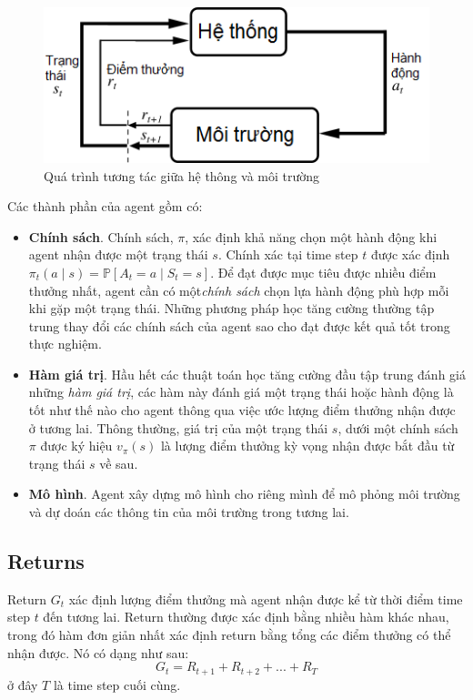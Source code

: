 	\begin{figure}
		\centering
		\includegraphics[width=\textwidth]{AgentEnvironment}
		\caption{Quá trình tương tác giữa hệ thông và môi trường}
		\label{AgentEnvironment}
	\end{figure}
	
	Các thành phần của agent gồm có:
	\begin{itemize}
		\item \textbf{Chính sách}. Chính sách, $\pi$, xác định khả năng chọn một hành động khi agent nhận được một trạng thái $s$. Chính xác tại time step $t$ được xác định $\pi_t(a \mid s) = \mathbb{P}[\mathit{A_t} = a \mid \mathit{S_t} = s]$. Để đạt được mục tiêu được nhiều điểm thưởng nhất, agent cần có một\textit{chính sách} chọn lựa hành động phù hợp mỗi khi gặp một trạng thái. Những phương pháp học tăng cường thường tập trung thay đổi các chính sách của agent sao cho đạt được kết quả tốt trong thực nghiệm.
		\item \textbf{Hàm giá trị}. Hầu hết các thuật toán học tăng cường đầu tập trung đánh giá những \textit{hàm giá trị}, các hàm này đánh giá một trạng thái hoặc hành động là tốt như thế nào cho agent thông qua việc ước lượng điểm thưởng nhận được ở tương lai. Thông thường, giá trị của một trạng thái $s$, dưới một chính sách $\pi$  được ký hiệu $v_{\pi}(s)$ là lượng điểm thưởng kỳ vọng nhận được bắt đầu từ trạng thái $s$ về sau.
		\item \textbf{Mô hình}. Agent xây dựng mô hình cho riêng mình để mô phỏng môi trường và dự doán các thông tin của môi trường trong tương lai.
	\end{itemize}	
	
	\subsection{Returns}
	Return $\mathit{G_t}$ xác định lượng điểm thưởng mà agent nhận được kể từ thời điểm time step $t$ đến tương lai. Return thường được xác định bằng nhiều hàm khác nhau, trong đó hàm đơn giản nhất xác định return bằng tổng các điểm thưởng có thể nhận được. Nó có dạng như sau:
	\begin{equation}
	\mathit{G_t} = \mathit{R_{t+1}} + \mathit{R_{t+2}} + ... + \mathit{R_{T}}
	\end{equation}	
	ở đây $T$ là time step cuối cùng.
	

